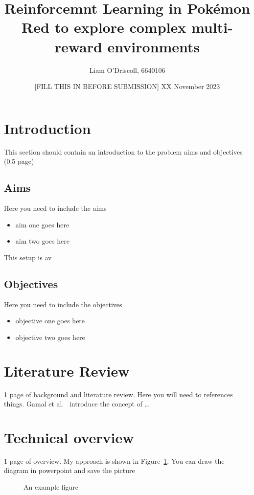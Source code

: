 \documentclass{sj_surrey_article}
\title{Reinforcemnt Learning in Pokémon Red to explore complex multi-reward environments}
\author{Liam O'Driscoll, 6640106}
\date{ [FILL THIS IN BEFORE SUBMISSION] XX November 2023}
\begin{document}
\maketitle



\section{Introduction}
This section should contain an introduction to the problem aims and objectives (0.5 page)
\subsection{Aims}
Here you need to include the aims
\begin{itemize}
\item aim one goes here
\item aim two goes here
\end{itemize}

This setup is av
\subsection{Objectives}
Here you need to include the objectives
\begin{itemize}
\item objective one goes here
\item objective two goes here
\end{itemize}

\section{Literature Review}
1 page of background and literature review. Here you will need to references things. Gamal et al.~\cite{gamal} introduce the concept of \ldots

\section{Technical overview}
1 page of overview. My approach is shown in Figure~\ref{fig:sample}. You can draw the diagram in powerpoint and save the picture

\begin{figure}[thp]
   \begin{center}
   \end{center}
   \caption{An example figure}
   \label{fig:sample}
\end{figure}
\end{document}
